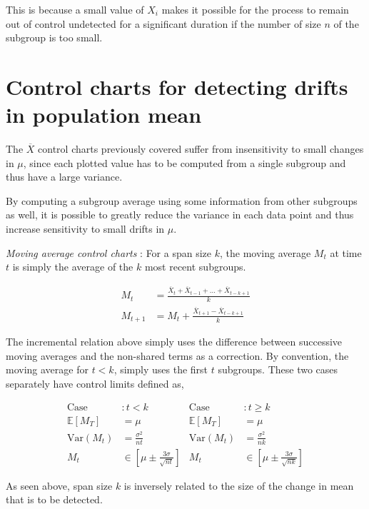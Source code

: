 This is because a small value of $ X_i $ makes it possible for the process to remain out of control undetected for a significant duration if the number of size $ n $ of the subgroup is too small.

\section{Control charts for detecting drifts in population mean}

The $ \overline{X} $ control charts previously covered suffer from insensitivity to small changes in $ \mu $, since each plotted value has to be computed from a single subgroup and thus have a large variance.

By computing a subgroup average using some information from other subgroups as well, it is possible to greatly reduce the variance in each data point and thus increase sensitivity to small drifts in $ \mu $.

\textit{Moving average control charts} : For a span size $ k $, the moving average $ M_t $ at time $ t $ is simply the average of the $ k $ most recent subgroups.

\begin{align}
	M_t &= \frac{\overline{X}_t + \overline{X}_{t-1} + \dots + \overline{X}_{t-k+1}}{k} \\[1ex]
	M_{t+1} &= M_t + \frac{\overline{X}_{t+1} - \overline{X}_{t-k+1}}{k}
\end{align}

The incremental relation above simply uses the difference between successive moving averages and the non-shared terms as a correction. By convention, the moving average for $ t < k $, simply uses the first $ t $ subgroups. These two cases separately have control limits defined as,

\begin{align}
	\text{Case} &: t < k & \text{Case} &: t \geq k \nonumber \\
	\mathbb{E}[M_T] &= \mu & \mathbb{E}[M_T] &= \mu \\
	\mathrm{Var}(M_t) &= \frac{\sigma^2}{nt} & \mathrm{Var}(M_t) &= \frac{\sigma^2}{nk} \\
	M_t &\in \left[\mu \pm \frac{3\sigma}{\sqrt{nt}}\right] & M_t &\in \left[\mu \pm \frac{3\sigma}{\sqrt{nk}}\right] 
\end{align} 

As seen above, span size $ k $ is inversely related to the size of the change in mean that is to be detected.



